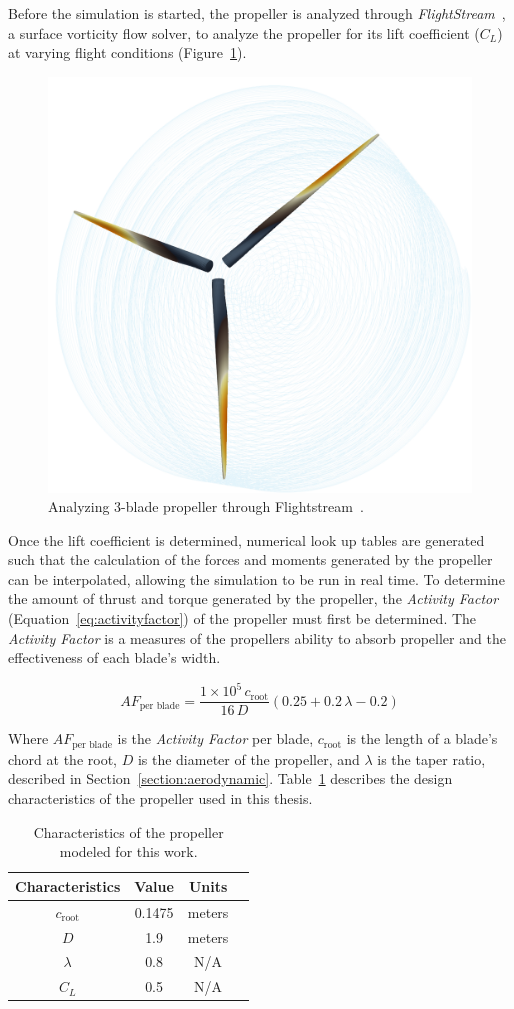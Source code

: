 Before the simulation is started, the propeller is analyzed through \textit{FlightStream}~\cite{FlightStream}, a surface vorticity flow solver, to analyze the propeller for its lift coefficient (\(C_L\)) at varying flight conditions (Figure~\ref{fig:flightstreamprop}).

\begin{figure}[!ht]\label{fig:flightstreamprop}
    \centering
    \includegraphics[width=.35\linewidth]{Figures/flightstreamprop.png}
    \caption{Analyzing 3-blade propeller through Flightstream~\cite{FlightStream}.}
\end{figure}

Once the lift coefficient is determined, numerical look up tables are generated such that the calculation of the forces and moments generated by the propeller can be interpolated, allowing the simulation to be run in real time. To determine the amount of thrust and torque generated by the propeller, the \textit{Activity Factor} (Equation~\ref{eq:activityfactor}) of the propeller must first be determined. The \textit{Activity Factor} is a measures of the propellers ability to absorb propeller and the effectiveness of each blade's width.

\begin{equation}\label{eq:activityfactor}
    AF_{\textrm{per blade}} = \frac{1 \times 10^5 \, c_{\textrm{root}}}{16 \, D} \left(0.25 + 0.2 \, \lambda - 0.2 \right)
\end{equation}

Where \(AF_{\textrm{per blade}}\) is the \textit{Activity Factor} per blade, \(c_{\textrm{root}}\) is the length of a blade's chord at the root, \(D\) is the diameter of the propeller, and \( \lambda \) is the taper ratio, described in Section~\ref{section:aerodynamic}. Table~\ref{tbl:propparams} describes the design characteristics of the propeller used in this thesis.

\begin{table}[!ht]\label{tbl:propparams}
    \caption{Characteristics of the propeller modeled for this work.}
    \centering
    \begin{tabular}{cccc}
        \toprule
        Characteristics       & Value  & Units  \\
        \midrule
        \(c_{\textrm{root}}\) & 0.1475 & meters \\
        \(D\)                 & 1.9    & meters \\
        \( \lambda \)         & 0.8    & N/A    \\
        \(C_L\)               & 0.5    & N/A    \\
        \bottomrule
    \end{tabular}
\end{table}

